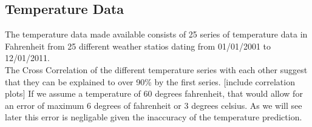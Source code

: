 \documentclass{article}
\begin{document}
\subsection{Temperature Data}

The temperature data made available consists of 25 series of temperature data in Fahrenheit from 25 different weather statios dating from 01/01/2001 to 12/01/2011.\\
The Cross Correlation of the different temperature series with each other suggest that they can be explained to over 90\% by the first series. [include correlation plots]
If we assume a temperature of 60 degrees fahrenheit, that would allow for an error of maximum 6 degrees of fahrenheit or 3 degrees celsius. As we will see later this error is negligable given the inaccuracy of the temperature prediction.
\end{document}
